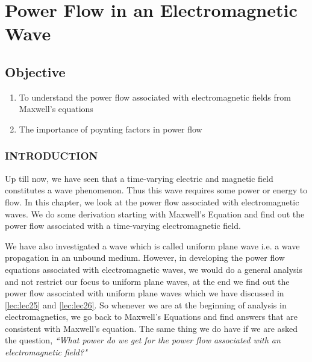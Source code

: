 \chapter{Power Flow in an Electromagnetic Wave}\label{lec:lec27}
\begin{mdframed}[backgroundcolor=lightblue, linewidth=1pt,  hidealllines=true]
\section{Objective}
\begin{enumerate}
	\item To understand the power flow associated with electromagnetic fields from Maxwell's equations
	\item The importance of poynting factors in power flow
\end{enumerate}
\end{mdframed}
	\subsection{INTRODUCTION}
Up till now, we have seen that a time-varying electric and magnetic field constitutes a wave phenomenon. Thus this wave requires some power or energy to flow. In this chapter, we look at the power flow associated with electromagnetic waves. We do some derivation starting with Maxwell's Equation and find out the power flow associated with a time-varying electromagnetic field.

 We have also investigated a wave which is called uniform plane wave i.e. a wave propagation in an unbound medium. However, in developing the power flow equations associated with electromagnetic waves, we would do a general analysis and not restrict our focus to uniform plane waves, at the end we find out the power flow associated with uniform plane waves which we have discussed in \autoref{lec:lec25} and \autoref{lec:lec26}. So whenever we are at the beginning of analysis in electromagnetics, we go back to Maxwell's Equations and find answers that are consistent with Maxwell's equation. The same thing we do have if we are asked the question,  \emph{``What power do we get for the power flow associated with an electromagnetic field?"}

